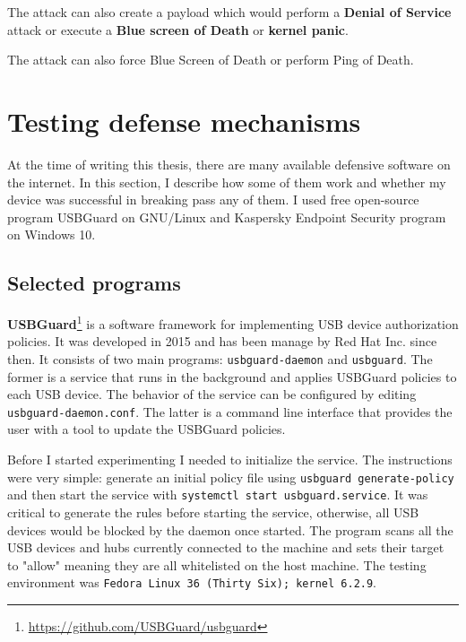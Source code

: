 
The attack can also create a payload which would perform a \textbf{Denial of Service} attack or execute a \textbf{Blue screen of Death} or \textbf{kernel panic}.


The attack can also force Blue Screen of Death or perform Ping of Death.


\chapter{Testing defense mechanisms}
\label{defense}
At the time of writing this thesis, there are many available defensive software on the internet. In this section, I describe how some of them work and whether my device was successful in breaking pass any of them. I used free open-source program USBGuard on GNU/Linux and Kaspersky Endpoint Security program on Windows 10.

\section{Selected programs}
\textbf{USBGuard}\footnote{\url{https://github.com/USBGuard/usbguard}} is a software framework for implementing USB device authorization policies. It was developed in 2015 and has been manage by Red Hat Inc. since then. It consists of two main programs: \verb|usbguard-daemon| and \verb|usbguard|. The former is a service that runs in the background and applies USBGuard policies to each USB device. The behavior of the service can be configured by editing \verb|usbguard-daemon.conf|. The latter is a command line interface that provides the user with a tool to update the USBGuard policies.

Before I started experimenting I needed to initialize the service. The instructions were very simple: generate an initial policy file using \verb|usbguard generate-policy| and then start the service with \verb|systemctl start usbguard.service|. It was critical to generate the rules before starting the service, otherwise, all USB devices would be blocked by the daemon once started. The program scans all the USB devices and hubs currently connected to the machine and sets their target to "allow" meaning they are all whitelisted on the host machine. The testing environment was \verb|Fedora Linux 36 (Thirty Six); kernel 6.2.9|.

